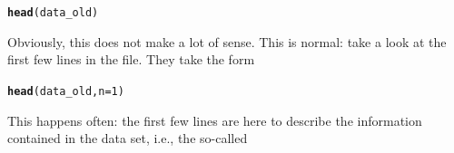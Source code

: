 \documentclass[aspectratio=169]{beamer}\usepackage[]{graphicx}\usepackage[]{xcolor}
\makeatletter
\newcommand{\hlnum}[1]{\textcolor[rgb]{0.686,0.059,0.569}{#1}}%
\newcommand{\hldef}[1]{\textcolor[rgb]{0.345,0.345,0.345}{#1}}%
\newcommand{\hlkwc}[1]{\textcolor[rgb]{0.333,0.667,0.333}{#1}}%
\newcommand{\hlkwd}[1]{\textcolor[rgb]{0.737,0.353,0.396}{\textbf{#1}}}%
\newenvironment{kframe}{%
 \def\at@end@of@kframe{}%
 \ifinner\ifhmode%
  \def\at@end@of@kframe{\end{minipage}}%
  \begin{minipage}{\columnwidth}%
 \fi\fi%
 \def\FrameCommand##1{\hskip\@totalleftmargin \hskip-\fboxsep
 \colorbox{shadecolor}{##1}\hskip-\fboxsep
     \hskip-\linewidth \hskip-\@totalleftmargin \hskip\columnwidth}%
 \MakeFramed {\advance\hsize-\width
   \@totalleftmargin\z@ \linewidth\hsize
   \@setminipage}}%
 {\par\unskip\endMakeFramed%
 \at@end@of@kframe}
\newenvironment{knitrout}{}{} %
\makeatother
\begin{document}
\begin{frame}[fragile]
\begin{knitrout}
\color{fgcolor}\begin{kframe}
\begin{alltt}
\hlkwd{head}\hldef{(data_old)}
\end{alltt}


{\ttfamily\noindent\bfseries\color{errorcolor}{\#\# Error in `h()`:\\\#\# ! error in evaluating the argument 'x' in selecting a method for function 'head': object 'data\_old' not found}}\end{kframe}
\end{knitrout}
\end{frame}

\begin{frame}[fragile]
Obviously, this does not make a lot of sense. This is normal: take a look at the first few lines in the file. They take the form
\begin{knitrout}
\color{fgcolor}\begin{kframe}
\begin{alltt}
\hlkwd{head}\hldef{(data_old,} \hlkwc{n} \hldef{=} \hlnum{1}\hldef{)}
\end{alltt}


{\ttfamily\noindent\bfseries\color{errorcolor}{\#\# Error in `h()`:\\\#\# ! error in evaluating the argument 'x' in selecting a method for function 'head': object 'data\_old' not found}}\end{kframe}
\end{knitrout}
\vfill
This happens often: the first few lines are here to describe the information contained in the data set, i.e., the so-called 
\end{frame}
\end{document}
